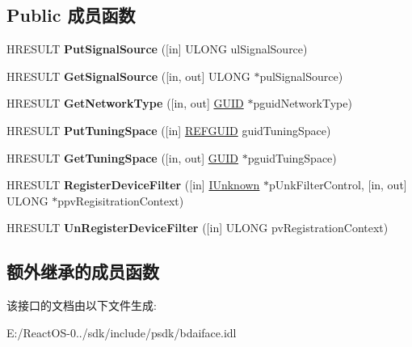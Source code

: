 \subsection*{Public 成员函数}
\begin{DoxyCompactItemize}
\item 
\mbox{\label{interface_i_b_d_a___network_provider_a738fd7e11986441c3eefecff6465f015}} 
H\+R\+E\+S\+U\+LT {\bfseries Put\+Signal\+Source} (\mbox{[}in\mbox{]} U\+L\+O\+NG ul\+Signal\+Source)
\item 
\mbox{\label{interface_i_b_d_a___network_provider_ab2b456481e5e635fc8c2efa8591f92c9}} 
H\+R\+E\+S\+U\+LT {\bfseries Get\+Signal\+Source} (\mbox{[}in, out\mbox{]} U\+L\+O\+NG $\ast$pul\+Signal\+Source)
\item 
\mbox{\label{interface_i_b_d_a___network_provider_ade823951167572c0757298e39d952932}} 
H\+R\+E\+S\+U\+LT {\bfseries Get\+Network\+Type} (\mbox{[}in, out\mbox{]} \hyperlink{interface_g_u_i_d}{G\+U\+ID} $\ast$pguid\+Network\+Type)
\item 
\mbox{\label{interface_i_b_d_a___network_provider_a28d9b31611a308c72599e40640f9d93c}} 
H\+R\+E\+S\+U\+LT {\bfseries Put\+Tuning\+Space} (\mbox{[}in\mbox{]} \hyperlink{struct___g_u_i_d}{R\+E\+F\+G\+U\+ID} guid\+Tuning\+Space)
\item 
\mbox{\label{interface_i_b_d_a___network_provider_aa8cffd06aaba8028b91d59a574c68663}} 
H\+R\+E\+S\+U\+LT {\bfseries Get\+Tuning\+Space} (\mbox{[}in, out\mbox{]} \hyperlink{interface_g_u_i_d}{G\+U\+ID} $\ast$pguid\+Tuing\+Space)
\item 
\mbox{\label{interface_i_b_d_a___network_provider_ad12919456b0a8f863875972962c87dc1}} 
H\+R\+E\+S\+U\+LT {\bfseries Register\+Device\+Filter} (\mbox{[}in\mbox{]} \hyperlink{interface_i_unknown}{I\+Unknown} $\ast$p\+Unk\+Filter\+Control, \mbox{[}in, out\mbox{]} U\+L\+O\+NG $\ast$ppv\+Regisitration\+Context)
\item 
\mbox{\label{interface_i_b_d_a___network_provider_a67f7dc456b9a6ddf03b1d6579eff5113}} 
H\+R\+E\+S\+U\+LT {\bfseries Un\+Register\+Device\+Filter} (\mbox{[}in\mbox{]} U\+L\+O\+NG pv\+Registration\+Context)
\end{DoxyCompactItemize}
\subsection*{额外继承的成员函数}


该接口的文档由以下文件生成\+:\begin{DoxyCompactItemize}
\item 
E\+:/\+React\+O\+S-\/0../sdk/include/psdk/bdaiface.\+idl\end{DoxyCompactItemize}
